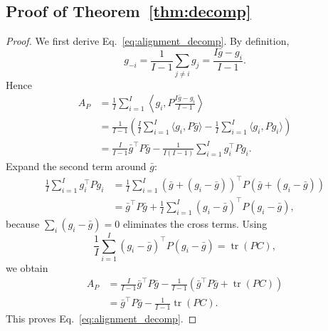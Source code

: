 \documentclass{article}
\newcommand{\tr}{\operatorname{tr}}
\begin{document}
\subsection{Proof of Theorem~\ref{thm:decomp}}

\begin{proof}
We first derive Eq.~\eqref{eq:alignment_decomp}. By definition,
\begin{equation}
    g_{-i} = \frac{1}{I-1}\sum_{j\neq i} g_j
    = \frac{I\bar g - g_i}{I-1}.
\end{equation}
Hence
\begin{align}
    A_P
    &=
    \frac{1}{I}\sum_{i=1}^{I}\left\langle g_i, P\frac{I\bar g - g_i}{I-1}\right\rangle \\
    &=
    \frac{1}{I-1}\left(
        \frac{I}{I}\sum_{i=1}^{I}\langle g_i, P\bar g\rangle
        -
        \frac{1}{I}\sum_{i=1}^{I}\langle g_i, P g_i\rangle
    \right) \\
    &=
    \frac{I}{I-1}\bar g^\top P \bar g
    -
    \frac{1}{I(I-1)}\sum_{i=1}^{I} g_i^\top P g_i.
\end{align}
Expand the second term around $\bar g$:
\begin{align}
    \frac{1}{I}\sum_{i=1}^{I} g_i^\top P g_i
    &=
    \frac{1}{I}\sum_{i=1}^{I}(\bar g + (g_i-\bar g))^\top P(\bar g + (g_i-\bar g)) \\
    &=
    \bar g^\top P \bar g
    +
    \frac{1}{I}\sum_{i=1}^{I}(g_i-\bar g)^\top P(g_i-\bar g),
\end{align}
because $\sum_i (g_i-\bar g)=0$ eliminates the cross terms. Using
\begin{equation}
    \frac{1}{I}\sum_{i=1}^{I}(g_i-\bar g)^\top P(g_i-\bar g)
    =
    \tr\!\left(P C\right),
\end{equation}
we obtain
\begin{align}
    A_P
    &=
    \frac{I}{I-1}\bar g^\top P \bar g
    -
    \frac{1}{I-1}\left(
        \bar g^\top P \bar g + \tr(P C)
    \right) \\
    &=
    \bar g^\top P \bar g - \frac{1}{I-1}\tr(P C).
\end{align}
This proves Eq.~\eqref{eq:alignment_decomp}.


\end{proof}
\end{document}
